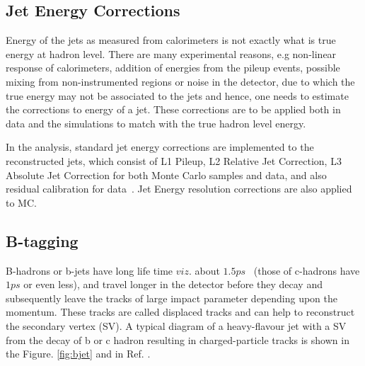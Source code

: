 \subsection{Jet Energy Corrections}
Energy of the jets as measured from calorimeters is not exactly what is true energy at hadron level. There are many experimental reasons, e.g non-linear response of calorimeters, addition of energies from the pileup events, possible mixing from non-instrumented regions or noise in the detector, due to which the true energy may not be associated to the jets and hence, one needs to estimate the corrections to energy of a jet. These corrections are to be applied both in data and the simulations to match with the true hadron level energy.
\par In the analysis, standard jet energy corrections are implemented to the reconstructed jets,
which consist of L1 Pileup, L2 Relative Jet Correction,
L3 Absolute Jet Correction for both Monte Carlo samples and data,
and also residual calibration for data~\cite{JECMC2018}. Jet Energy resolution corrections are also applied to MC.


\subsection{B-tagging}
B-hadrons or b-jets have long life time $viz.$ about $1.5 ps$~ (those of c-hadrons have $1 ps$ or even less), and travel longer in the detector before they decay and subsequently leave the tracks of large impact parameter  depending upon the momentum.
These tracks are called displaced tracks and can help to reconstruct the secondary vertex (SV). 
A typical diagram of a heavy-flavour jet with a SV from the decay of b or c hadron resulting in charged-particle tracks is shown in the Figure. \ref{fig:bjet} and in Ref. \cite{Sirunyan:2017ezt}.



